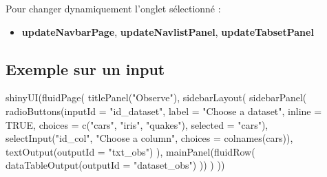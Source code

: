 \documentclass[
]{article}
\newenvironment{Shaded}{\begin{snugshade}}{\end{snugshade}}
\newcommand{\AttributeTok}[1]{\textcolor[rgb]{0.77,0.63,0.00}{#1}}
\newcommand{\ConstantTok}[1]{\textcolor[rgb]{0.00,0.00,0.00}{#1}}
\newcommand{\FunctionTok}[1]{\textcolor[rgb]{0.00,0.00,0.00}{#1}}
\newcommand{\NormalTok}[1]{#1}
\newcommand{\StringTok}[1]{\textcolor[rgb]{0.31,0.60,0.02}{#1}}
\providecommand{\tightlist}{%
  \setlength{\itemsep}{0pt}\setlength{\parskip}{0pt}}
\begin{document}
Pour changer dynamiquement l'onglet sélectionné :

\begin{itemize}
\tightlist
\item
  \textbf{updateNavbarPage}, \textbf{updateNavlistPanel},
  \textbf{updateTabsetPanel}
\end{itemize}

\hypertarget{exemple-sur-un-input}{%
\subsection{Exemple sur un input}\label{exemple-sur-un-input}}

\begin{Shaded}
\begin{Highlighting}[]
\FunctionTok{shinyUI}\NormalTok{(}\FunctionTok{fluidPage}\NormalTok{(}
  \FunctionTok{titlePanel}\NormalTok{(}\StringTok{"Observe"}\NormalTok{),}
  \FunctionTok{sidebarLayout}\NormalTok{(}
    \FunctionTok{sidebarPanel}\NormalTok{(}
      \FunctionTok{radioButtons}\NormalTok{(}\AttributeTok{inputId =} \StringTok{"id\_dataset"}\NormalTok{, }\AttributeTok{label =} \StringTok{"Choose a dataset"}\NormalTok{, }\AttributeTok{inline =} \ConstantTok{TRUE}\NormalTok{,}
                   \AttributeTok{choices =} \FunctionTok{c}\NormalTok{(}\StringTok{"cars"}\NormalTok{, }\StringTok{"iris"}\NormalTok{, }\StringTok{"quakes"}\NormalTok{), }\AttributeTok{selected =} \StringTok{"cars"}\NormalTok{),}
      \FunctionTok{selectInput}\NormalTok{(}\StringTok{"id\_col"}\NormalTok{, }\StringTok{"Choose a column"}\NormalTok{, }\AttributeTok{choices =} \FunctionTok{colnames}\NormalTok{(cars)),}
      \FunctionTok{textOutput}\NormalTok{(}\AttributeTok{outputId =} \StringTok{"txt\_obs"}\NormalTok{)}
\NormalTok{    ),}
    \FunctionTok{mainPanel}\NormalTok{(}\FunctionTok{fluidRow}\NormalTok{(}
      \FunctionTok{dataTableOutput}\NormalTok{(}\AttributeTok{outputId =} \StringTok{"dataset\_obs"}\NormalTok{)}
\NormalTok{    ))}
\NormalTok{  )}
\NormalTok{))}
\end{Highlighting}
\end{Shaded}
\end{document}
